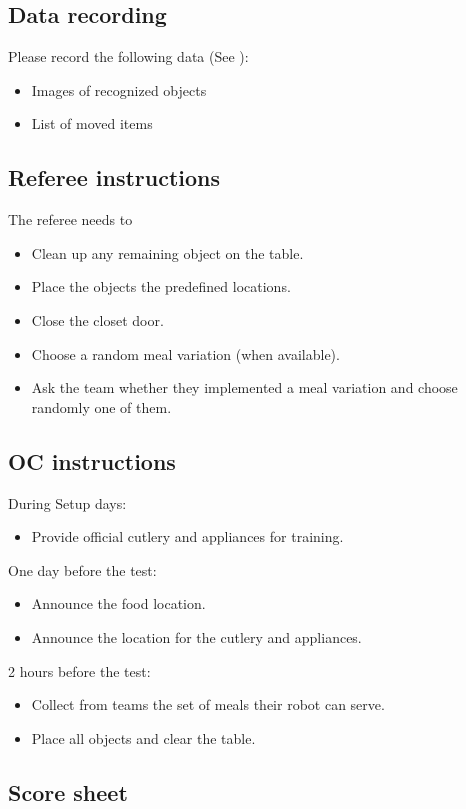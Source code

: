 \subsection{Data recording}
  Please record the following data (See ):
  \begin{itemize}
   \item Images of recognized objects
   \item List of moved items
  \end{itemize}

\subsection{Referee instructions}

The referee needs to
\begin{itemize}
	\item Clean up any remaining object on the table.
	\item Place the objects the predefined locations.
	\item Close the closet door.
	\item Choose a random meal variation (when available).
	\item Ask the team whether they implemented a meal variation and choose randomly one of them.
\end{itemize}

\subsection{OC instructions}
During Setup days:
\begin{itemize}
	\item Provide official cutlery and appliances for training.
\end{itemize}

One day before the test:
\begin{itemize}
	\item Announce the food location.
	\item Announce the location for the cutlery and appliances.
\end{itemize}

2 hours before the test:
\begin{itemize}
	\item Collect from teams the set of meals their robot can serve.
	\item Place all objects and clear the table.
\end{itemize}


\subsection{Score sheet}


